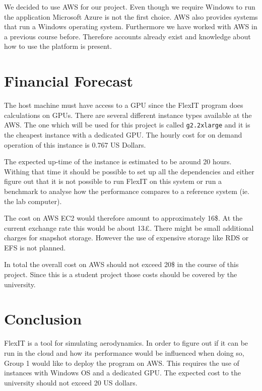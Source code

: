 \documentclass[11pt]{article}
\begin{document}
We decided to use AWS for our project. Even though we require Windows to run the application Microsoft Azure is not the first choice. AWS also provides systems that run a Windows operating system. Furthermore we have worked with AWS in a previous course before. Therefore accounts already exist and knowledge about how to use the platform is present.


\section{Financial Forecast}

The host machine must have access to a GPU since the FlexIT program does calculations on GPUs. There are several different instance types available at the AWS. The one which will be used for this project is called \texttt{g2.2xlarge} and it is the cheapest instance with a dedicated GPU. The hourly cost for on demand operation of this instance is $0.767$ US Dollars. 

The expected up-time of the instance is estimated to be around 20 hours. Withing that time it should be possible to set up all the dependencies and either figure out that it is not possible to run FlexIT on this system or run a benchmark to analyse how the performance compares to a reference system (ie. the lab computer).

The cost on AWS EC2 would therefore amount to approximately 16\$. At the current exchange rate this would be about 13\pounds. There might be small additional charges for snapshot storage. However the use of expensive storage like RDS or EFS is not planned. 

In total the overall cost on AWS should not exceed 20\$ in the course of this project. Since this is a student project those costs should be covered by the university. 


\newpage
\section{Conclusion}


FlexIT is a tool for simulating aerodynamics. In order to figure out if it can be run in the cloud and how its performance would be influenced when doing so, Group 1 would like to deploy the program on AWS.
This requires the use of instances with Windows OS and a dedicated GPU. The expected cost to the university should not exceed 20 US dollars. 
\end{document}
